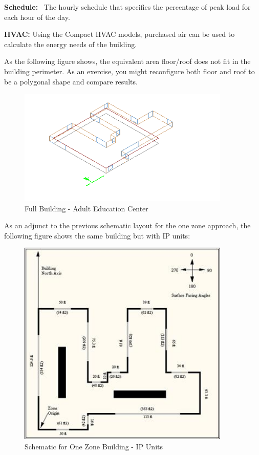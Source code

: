 \textbf{Schedule:}~ The hourly schedule that specifies the percentage of peak load for each hour of the day.

\textbf{HVAC:} Using the Compact HVAC models, purchased air can be used to calculate the energy needs of the building.

As the following figure shows, the equivalent area floor/roof does not fit in the building perimeter. As an exercise, you might reconfigure both floor and roof to be a polygonal shape and compare results.

\begin{figure}[hbtp] %
\centering
\includegraphics[width=0.9\textwidth, height=0.9\textheight, keepaspectratio=true]{media/image018.png}
\caption{Full Building - Adult Education Center \protect \label{fig:full-building-adult-education-center}}
\end{figure}

As an adjunct to the previous schematic layout for the one zone approach, the following figure shows the same building but with IP units:

\begin{figure}[hbtp] %
\centering
\includegraphics[width=0.9\textwidth, height=0.9\textheight, keepaspectratio=true]{media/image019.jpg}
\caption{Schematic for One Zone Building - IP Units \protect \label{fig:schematic-for-one-zone-building-ip-units}}
\end{figure}
